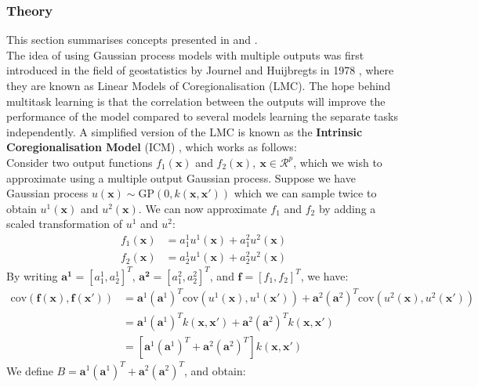 \documentclass[a4paper,12pt]{article}
\begin{document}
\subsubsection{Theory}
This section summarises concepts presented in \cite{alvarez2009} and \cite{MOGP_slides}.\\
The idea of using Gaussian process models with multiple outputs was first introduced in the field of geostatistics by Journel and Huijbregts in 1978 \cite{Journel1978}, where they are known as Linear Models of Coregionalisation (LMC). The hope behind multitask learning is that the correlation between the outputs will improve the performance of the model compared to several models learning the separate tasks independently. A simplified version of the LMC is known as the \textbf{Intrinsic Coregionalisation Model} (ICM) \cite{Goovaerts1997}, which works as follows: \\
Consider two output functions $f_1(\mathbf{x})$ and $f_2(\mathbf{x}), \ \mathbf{x} \in \mathcal{R}^p$, which we wish to approximate using a multiple output Gaussian process. Suppose we have Gaussian process $u(\mathbf{x}) \sim \text{GP}(0, k(\mathbf{x}, \mathbf{x'}))$ which we can sample twice to obtain $u^1(\mathbf{x})$ and $u^2(\mathbf{x})$. We can now approximate $f_1$ and $f_2$ by adding a scaled transformation of $u^1$ and $u^2$:
\begin{equation}
\begin{aligned}
  f_1(\mathbf{x}) &= a_1^1 u^1(\mathbf{x}) + a_1^2 u^2(\mathbf{x})\\
  f_2(\mathbf{x}) &= a_2^1 u^1(\mathbf{x}) + a_2^2 u^2(\mathbf{x})
\end{aligned}
\end{equation}
By writing $\mathbf{a^1} = [a_1^1, a_2^1]^T$, $\mathbf{a^2} = [a_1^2, a_2^2]^T$, and $\mathbf{f} = [f_1, f_2]^T$, we have:
\begin{align*}
    \text{cov}(\mathbf{f}(\mathbf{x}), \mathbf{f}(\mathbf{x'})) &= \mathbf{a}^1(\mathbf{a}^1)^T \text{cov}(u^1(\mathbf{x}), u^1(\mathbf{x'})) + \mathbf{a}^2(\mathbf{a}^2)^T \text{cov}(u^2(\mathbf{x}), u^2(\mathbf{x'})) \\
    &= \mathbf{a}^1(\mathbf{a}^1)^T k(\mathbf{x}, \mathbf{x'}) + \mathbf{a}^2(\mathbf{a}^2)^T k(\mathbf{x}, \mathbf{x'})\\
    &= [\mathbf{a}^1(\mathbf{a}^1)^T + \mathbf{a}^2(\mathbf{a}^2)^T] k(\mathbf{x}, \mathbf{x'})
\end{align*}
We define $B = \mathbf{a}^1(\mathbf{a}^1)^T + \mathbf{a}^2(\mathbf{a}^2)^T$, and obtain:
\end{document}
